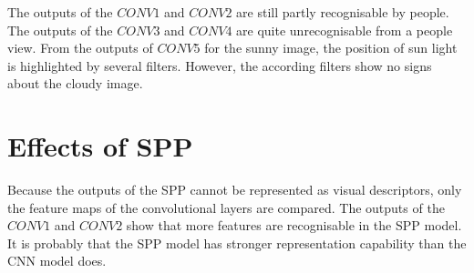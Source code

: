 The outputs of the $CONV1$ and $CONV2$ are still partly recognisable by people. The outputs of the $CONV3$ and $CONV4$ are quite unrecognisable from a people view. From the outputs of $CONV5$ for the sunny image, the position of sun light is highlighted by several filters. However, the according filters show no signs about the cloudy image.

\section{Effects of SPP}

Because the outputs of the SPP cannot be represented as visual descriptors, only the feature maps of the convolutional layers are compared. The outputs of the $CONV1$ and $CONV2$ show that more features are recognisable in the SPP model. It is probably that the SPP model has stronger representation capability than the CNN model does.
 
